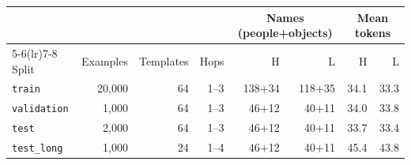\begin{tabular}{lrrrrrrr}
\toprule
& & & & \multicolumn{2}{c}{Names (people+objects)} & \multicolumn{2}{c}{Mean tokens} \\
\cmidrule(lr){5-6}\cmidrule(lr){7-8}
Split & Examples & Templates & Hops & H & L & H & L \\
\midrule
\texttt{train} & 20,000 & 64 & 1--3 & 138+34 & 118+35 & 34.1 & 33.3 \\
\texttt{validation} & 1,000 & 64 & 1--3 & 46+12 & 40+11 & 34.0 & 33.8 \\
\texttt{test} & 2,000 & 64 & 1--3 & 46+12 & 40+11 & 33.7 & 33.4 \\
\texttt{test\_long} & 1,000 & 24 & 1--4 & 46+12 & 40+11 & 45.4 & 43.8 \\
\bottomrule
\end{tabular}
